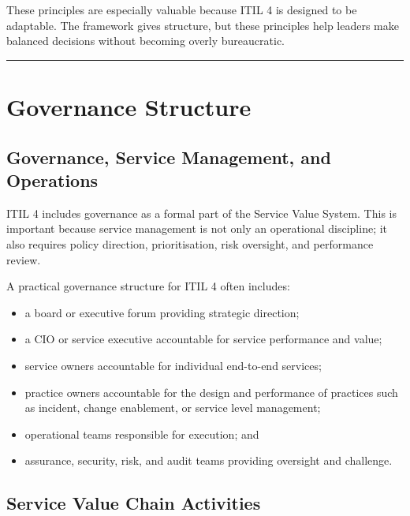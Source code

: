 \documentclass[
  letterpaper,
  DIV=11,
  numbers=noendperiod]{scrartcl}
\providecommand{\tightlist}{%
  \setlength{\itemsep}{0pt}\setlength{\parskip}{0pt}}
\begin{document}
These principles are especially valuable because ITIL 4 is designed to
be adaptable. The framework gives structure, but these principles help
leaders make balanced decisions without becoming overly bureaucratic.

\begin{center}\rule{0.5\linewidth}{0.5pt}\end{center}

\section{Governance Structure}\label{governance-structure}

\subsection{Governance, Service Management, and
Operations}\label{governance-service-management-and-operations}

ITIL 4 includes governance as a formal part of the Service Value System.
This is important because service management is not only an operational
discipline; it also requires policy direction, prioritisation, risk
oversight, and performance review.

A practical governance structure for ITIL 4 often includes:

\begin{itemize}
\tightlist
\item
  a board or executive forum providing strategic direction;
\item
  a CIO or service executive accountable for service performance and
  value;
\item
  service owners accountable for individual end-to-end services;
\item
  practice owners accountable for the design and performance of
  practices such as incident, change enablement, or service level
  management;
\item
  operational teams responsible for execution; and
\item
  assurance, security, risk, and audit teams providing oversight and
  challenge.
\end{itemize}

\subsection{Service Value Chain
Activities}\label{service-value-chain-activities}
\end{document}
